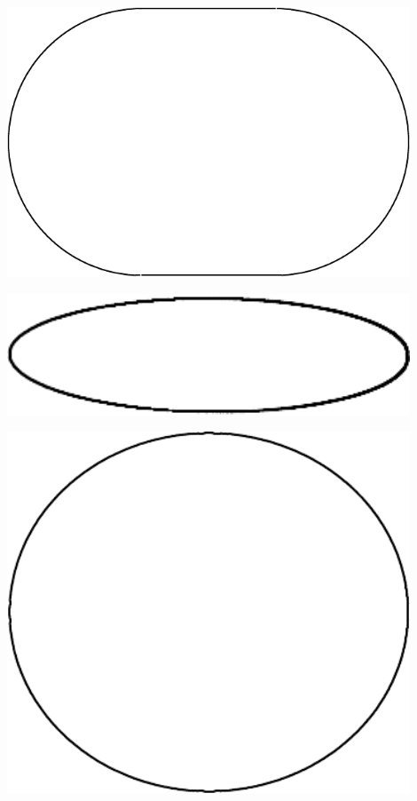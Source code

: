 \documentclass[12pt]{article}
\begin{document}
\begin{minipage}{0.25\textwidth}
	\begin{center}
	\includegraphics[width=0.9\textwidth]{oval-crop.pdf}
	\end{center}
\end{minipage}
\begin{minipage}{0.25\textwidth}
	\begin{center}
		\includegraphics[width=0.9\textwidth]{highecc-crop.pdf}
	\end{center}
\end{minipage}
\begin{minipage}{0.25\textwidth}
	\begin{center}
		\includegraphics[width=0.9\textwidth]{lowecc-crop.pdf}
	\end{center}
\end{minipage}
\end{document}
